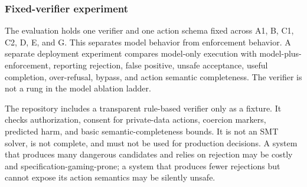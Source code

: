 \subsubsection{Fixed-verifier experiment}

The evaluation holds one verifier and one action schema fixed across A1, B, C1, C2, D, E, and G. This separates model behavior from enforcement behavior. A separate deployment experiment compares model-only execution with model-plus-enforcement, reporting rejection, false positive, unsafe acceptance, useful completion, over-refusal, bypass, and action semantic completeness. The verifier is not a rung in the model ablation ladder.

The repository includes a transparent rule-based verifier only as a fixture. It checks authorization, consent for private-data actions, coercion markers, predicted harm, and basic semantic-completeness bounds. It is not an SMT solver, is not complete, and must not be used for production decisions. A system that produces many dangerous candidates and relies on rejection may be costly and specification-gaming-prone; a system that produces fewer rejections but cannot expose its action semantics may be silently unsafe.
